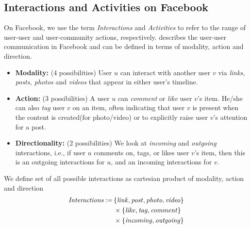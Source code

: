 \subsection{Interactions and Activities on Facebook}
On Facebook, we use the term {\em Interactions} and {\em Activities} to refer to the range of user-user and user-community actions, respectively.
 describes the user-user communication in Facebook and can be defined in terms of modality, action and direction.
\begin{itemize}
\item \textbf{Modality:} (4 possibilities)
User $u$ can interact with another user $v$ via \textit{links, posts, photos} and \textit{videos} that appear in either user's timeline.

\item \textbf{Action:} (3 possibilities)
A user $u$ can \textit{comment} or \textit{like} 
user $v$'s item. He/she can also \textit{tag} user $v$ on an 
item, often indicating that user $v$ is present when the content is created(for photo/video)
or to explicitly raise user $v$'s attention for a post.

\item \textbf{Directionality:} (2 possibilities)
We look at \textit{incoming} and \textit{outgoing} interactions, i.e.,
if user $u$ comments on, tags, or likes user $v$'s item,
then this is an outgoing interactions for $u$, and an incoming interactions for $v$.
\end{itemize}
 We define set of all possible interactions as cartesian product of modality, action and direction
\begin{align*}
  	\textit{Interactions} := \, & \{\link, \post, \photo, \video\} \\
                                                & \times \{\like, \ttag, \comment\} \\
                                                & \times \{\incoming, \outgoing\}
  \end{align*}

